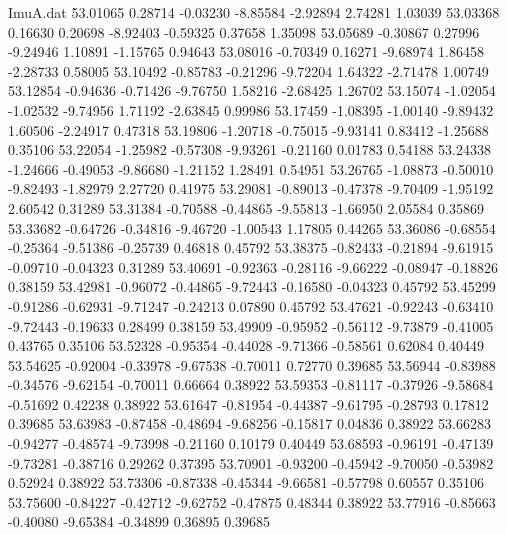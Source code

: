 \begin{filecontents}{ImuA.dat}
  53.01065    0.28714   -0.03230   -8.85584   -2.92894    2.74281    1.03039
  53.03368    0.16630    0.20698   -8.92403   -0.59325    0.37658    1.35098
  53.05689   -0.30867    0.27996   -9.24946    1.10891   -1.15765    0.94643
  53.08016   -0.70349    0.16271   -9.68974    1.86458   -2.28733    0.58005
  53.10492   -0.85783   -0.21296   -9.72204    1.64322   -2.71478    1.00749
  53.12854   -0.94636   -0.71426   -9.76750    1.58216   -2.68425    1.26702
  53.15074   -1.02054   -1.02532   -9.74956    1.71192   -2.63845    0.99986
  53.17459   -1.08395   -1.00140   -9.89432    1.60506   -2.24917    0.47318
  53.19806   -1.20718   -0.75015   -9.93141    0.83412   -1.25688    0.35106
  53.22054   -1.25982   -0.57308   -9.93261   -0.21160    0.01783    0.54188
  53.24338   -1.24666   -0.49053   -9.86680   -1.21152    1.28491    0.54951
  53.26765   -1.08873   -0.50010   -9.82493   -1.82979    2.27720    0.41975
  53.29081   -0.89013   -0.47378   -9.70409   -1.95192    2.60542    0.31289
  53.31384   -0.70588   -0.44865   -9.55813   -1.66950    2.05584    0.35869
  53.33682   -0.64726   -0.34816   -9.46720   -1.00543    1.17805    0.44265
  53.36086   -0.68554   -0.25364   -9.51386   -0.25739    0.46818    0.45792
  53.38375   -0.82433   -0.21894   -9.61915   -0.09710   -0.04323    0.31289
  53.40691   -0.92363   -0.28116   -9.66222   -0.08947   -0.18826    0.38159
  53.42981   -0.96072   -0.44865   -9.72443   -0.16580   -0.04323    0.45792
  53.45299   -0.91286   -0.62931   -9.71247   -0.24213    0.07890    0.45792
  53.47621   -0.92243   -0.63410   -9.72443   -0.19633    0.28499    0.38159
  53.49909   -0.95952   -0.56112   -9.73879   -0.41005    0.43765    0.35106
  53.52328   -0.95354   -0.44028   -9.71366   -0.58561    0.62084    0.40449
  53.54625   -0.92004   -0.33978   -9.67538   -0.70011    0.72770    0.39685
  53.56944   -0.83988   -0.34576   -9.62154   -0.70011    0.66664    0.38922
  53.59353   -0.81117   -0.37926   -9.58684   -0.51692    0.42238    0.38922
  53.61647   -0.81954   -0.44387   -9.61795   -0.28793    0.17812    0.39685
  53.63983   -0.87458   -0.48694   -9.68256   -0.15817    0.04836    0.38922
  53.66283   -0.94277   -0.48574   -9.73998   -0.21160    0.10179    0.40449
  53.68593   -0.96191   -0.47139   -9.73281   -0.38716    0.29262    0.37395
  53.70901   -0.93200   -0.45942   -9.70050   -0.53982    0.52924    0.38922
  53.73306   -0.87338   -0.45344   -9.66581   -0.57798    0.60557    0.35106
  53.75600   -0.84227   -0.42712   -9.62752   -0.47875    0.48344    0.38922
  53.77916   -0.85663   -0.40080   -9.65384   -0.34899    0.36895    0.39685

\end{filecontents}
